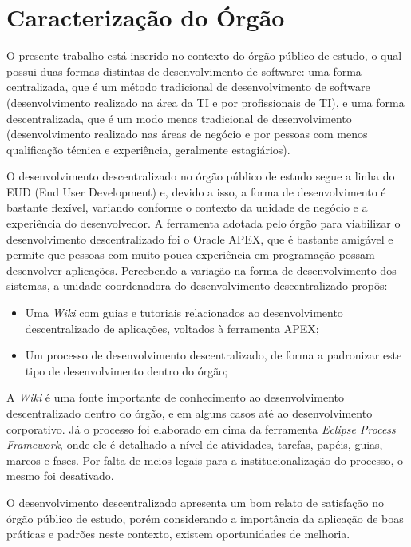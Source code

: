 \section{Caracterização do Órgão}

O presente trabalho está inserido no contexto do órgão público de estudo, o qual possui duas formas distintas de desenvolvimento de software: uma forma centralizada, que é um método tradicional de desenvolvimento de software (desenvolvimento realizado na área da TI e por profissionais de TI), e uma forma descentralizada, que é um modo menos tradicional de desenvolvimento (desenvolvimento realizado nas áreas de negócio e por pessoas com menos qualificação técnica e experiência, geralmente estagiários).

O desenvolvimento descentralizado no órgão público de estudo segue a linha do EUD (End User Development) e, devido a isso, a forma de desenvolvimento é bastante flexível, variando conforme o contexto da unidade de negócio e a experiência do desenvolvedor. A ferramenta adotada pelo órgão para viabilizar o desenvolvimento descentralizado foi o Oracle APEX, que é bastante amigável e permite que pessoas com muito pouca experiência em programação possam desenvolver aplicações. Percebendo a variação na forma de desenvolvimento dos sistemas, a unidade coordenadora do desenvolvimento descentralizado propôs:

\begin{itemize}
\item Uma \textit{Wiki} com guias e tutoriais relacionados ao desenvolvimento descentralizado de aplicações, voltados à ferramenta APEX;
\item Um processo de desenvolvimento descentralizado, de forma a padronizar este tipo de desenvolvimento dentro do órgão;
\end{itemize}

A \textit{Wiki} é uma fonte importante de conhecimento ao desenvolvimento descentralizado dentro do órgão, e em alguns casos até ao desenvolvimento corporativo. Já o processo foi elaborado em cima da ferramenta \textit{Eclipse Process Framework}, onde ele é detalhado a nível de atividades, tarefas, papéis, guias, marcos e fases. Por falta de meios legais para a institucionalização do processo, o mesmo foi desativado.

O desenvolvimento descentralizado apresenta um bom relato de satisfação no órgão público de estudo, porém considerando a importância da aplicação de boas práticas e padrões neste contexto, existem oportunidades de melhoria.


